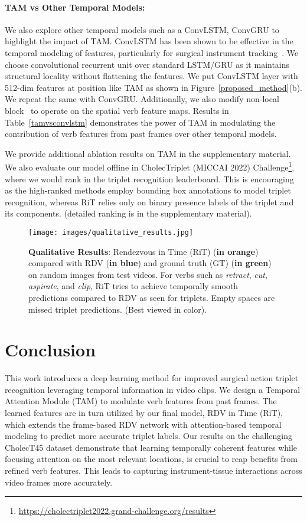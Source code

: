 \documentclass{article}
\begin{document}
\paragraph{\textbf{TAM vs Other Temporal Models:}} We also explore other temporal models such as a ConvLSTM, ConvGRU to highlight the impact of TAM. ConvLSTM has been shown to be effective in the temporal modeling of features, particularly for surgical instrument tracking~\cite{lstmtool}. We choose convolutional recurrent unit over standard LSTM/GRU as it maintains structural locality without flattening the features. We put  ConvLSTM layer with 512-dim features at position  like TAM as shown in Figure~\ref{proposed_method}(b). We repeat the same with ConvGRU. Additionally, we also modify  non-local block~\cite{wang2018non} to operate on the spatial verb feature maps. Results in Table~\ref{tamvsconvlstm} demonstrates the power of TAM in modulating the contribution of verb features from past frames over other temporal models.

We provide additional ablation results on TAM in the supplementary material. We also evaluate our model offline in CholecTriplet (MICCAI 2022) Challenge\footnote{\url{https://cholectriplet2022.grand-challenge.org/results}}, where we would rank  in the triplet recognition leaderboard. This is encouraging as the high-ranked methods employ bounding box annotations to model triplet recognition, whereas RiT relies only on binary presence labels of the triplet and its components. (detailed ranking is in the supplementary material).



\begin{figure}[t!]
    \centering
    \texttt{[image: images/qualitative\_results.jpg]}
    \caption{\textbf{Qualitative Results}: Rendezvous in Time (RiT) (\textbf{in orange}) compared with RDV (\textbf{in blue}) and ground truth (GT) (\textbf{in green}) on random images from test videos. For verbs such as \textit{retract}, \textit{cut}, \textit{aspirate}, and \textit{clip}, RiT tries to achieve temporally smooth predictions compared to RDV as seen for triplets. Empty spaces are missed triplet predictions. (Best viewed in color).}
    \label{qual_res}
\end{figure}


\section{Conclusion}
This work introduces a deep learning method for improved surgical action triplet recognition leveraging temporal information in video clips.
We design a Temporal Attention Module (TAM) to modulate verb features from past frames. The learned features are in turn utilized by our final model, RDV in Time (RiT), which extends the frame-based RDV network with attention-based temporal modeling to predict more accurate triplet labels.
Our results on the challenging CholecT45 dataset demonstrate that learning temporally coherent features while focusing attention on the most relevant locations, is crucial to reap benefits from refined verb features. This leads to capturing instrument-tissue interactions across video frames more accurately.
\end{document}
